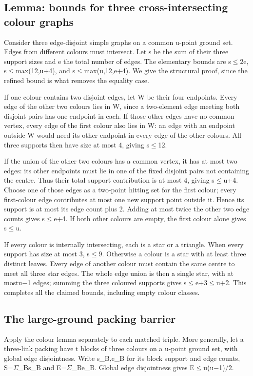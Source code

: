 \documentclass[11pt,a4paper]{article}
\begin{document}
\subsection{Lemma: bounds for three cross-intersecting colour graphs}
Consider three edge-disjoint simple graphs on a common u-point ground set. Edges from different colours must intersect. Let s be the sum of their three support sizes and e the total number of edges. The elementary bounds are s\ensuremath{\leq}2e, s\ensuremath{\leq}max(12,u+4), and s\ensuremath{\leq}max(u,12,e+4). We give the structural proof, since the refined bound is what removes the equality case.

If one colour contains two disjoint edges, let W be their four endpoints. Every edge of the other two colours lies in W, since a two-element edge meeting both disjoint pairs has one endpoint in each. If those other edges have no common vertex, every edge of the first colour also lies in W: an edge with an endpoint outside W would need its other endpoint in every edge of the other colours. All three supports then have size at most 4, giving s\ensuremath{\leq}12.

If the union of the other two colours has a common vertex, it has at most two edges: its other endpoints must lie in one of the fixed disjoint pairs not containing the centre. Thus their total support contribution is at most 4, giving s\ensuremath{\leq}u+4. Choose one of those edges as a two-point hitting set for the first colour; every first-colour edge contributes at most one new support point outside it. Hence its support is at most its edge count plus 2. Adding at most twice the other two edge counts gives s\ensuremath{\leq}e+4. If both other colours are empty, the first colour alone gives s\ensuremath{\leq}u.

If every colour is internally intersecting, each is a star or a triangle. When every support has size at most 3, s\ensuremath{\leq}9. Otherwise a colour is a star with at least three distinct leaves. Every edge of another colour must contain the same centre to meet all three star edges. The whole edge union is then a single star, with at mostu\ensuremath{-}1 edges; summing the three coloured supports gives s\ensuremath{\leq}e+3\ensuremath{\leq}u+2. This completes all the claimed bounds, including empty colour classes.

\subsection{The large-ground packing barrier}
Apply the colour lemma separately to each matched triple. More generally, let a three-link packing have t blocks of three colours on a u-point ground set, with global edge disjointness. Write s\_B,e\_B for its block support and edge counts, S=\ensuremath{\Sigma}\_Bs\_B and E=\ensuremath{\Sigma}\_Be\_B. Global edge disjointness gives E\ensuremath{\leq}u(u\ensuremath{-}1)/2.
\end{document}
